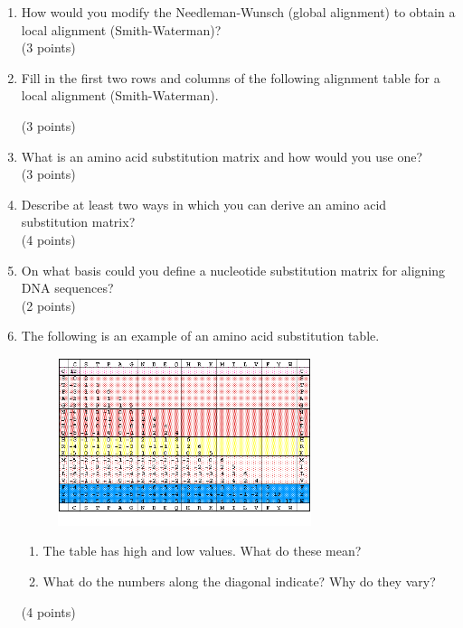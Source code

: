 \documentclass[11pt]{article}
\begin{document}
\begin{enumerate}
  \begin{figure}[H]
    \begin{tikzpicture}[scale=0.6]
      
    \end{tikzpicture}
  \end{figure}
  \begin{enumerate}
  \item Draw the process directly on the table.
  \item What kind of alignment(s) did you obtain?
  \end{enumerate}
  (4 points)
\item How would you modify the Needleman-Wunsch (global alignment) to
  obtain a local alignment (Smith-Waterman)?\\
  (3 points)
\item Fill in the first two rows and columns of the following
  alignment table for a local alignment (Smith-Waterman).
  \begin{figure}[H]
    \begin{tikzpicture}[scale=0.6]
      
    \end{tikzpicture}
  \end{figure}
  (3 points)
\item What is an amino acid substitution matrix and how would you use one?\\
  (3 points)
\item Describe at least two ways in which you can derive an amino acid
  substitution matrix?\\
  (4 points)
\item On what basis could you define a nucleotide substitution matrix for
  aligning DNA sequences?\\
  (2 points)
\item The following is an example of an amino acid substitution table.
  \begin{figure}[H]
    \includegraphics[width=0.7\textwidth]{images/dayhoff_256}
  \end{figure}
  \begin{enumerate}
  \item The table has high and low values. What do these mean?
  \item What do the numbers along the diagonal indicate? Why do they
    vary?
  \end{enumerate}
  (4 points)
\end{enumerate}
  
\end{document}
